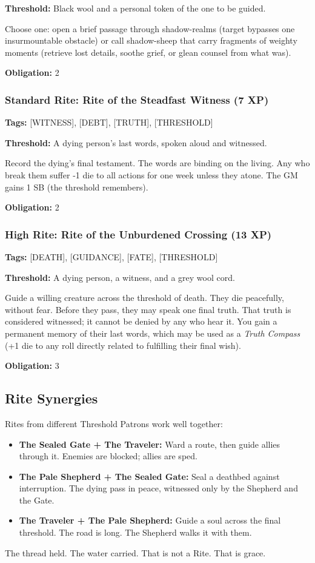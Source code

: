 \textbf{Threshold:} Black wool and a personal token of the one to be guided.

Choose one: open a brief passage through shadow-realms (target bypasses one insurmountable obstacle) or call shadow-sheep that carry fragments of weighty moments (retrieve lost details, soothe grief, or glean counsel from what was).

\textbf{Obligation:} 2

\subsubsection{Standard Rite: Rite of the Steadfast Witness (7 XP)}

\textbf{Tags:} [WITNESS], [DEBT], [TRUTH], [THRESHOLD]

\textbf{Threshold:} A dying person's last words, spoken aloud and witnessed.

Record the dying's final testament. The words are binding on the living. Any who break them suffer -1 die to all actions for one week unless they atone. The GM gains 1 SB (the threshold remembers).

\textbf{Obligation:} 2

\subsubsection{High Rite: Rite of the Unburdened Crossing (13 XP)}

\textbf{Tags:} [DEATH], [GUIDANCE], [FATE], [THRESHOLD]

\textbf{Threshold:} A dying person, a witness, and a grey wool cord.

Guide a willing creature across the threshold of death. They die peacefully, without fear. Before they pass, they may speak one final truth. That truth is considered witnessed; it cannot be denied by any who hear it. You gain a permanent memory of their last words, which may be used as a \textit{Truth Compass} (+1 die to any roll directly related to fulfilling their final wish).

\textbf{Obligation:} 3

\subsection{Rite Synergies}

Rites from different Threshold Patrons work well together:

\begin{itemize}
\item \textbf{The Sealed Gate + The Traveler:} Ward a route, then guide allies through it. Enemies are blocked; allies are sped.
\item \textbf{The Pale Shepherd + The Sealed Gate:} Seal a deathbed against interruption. The dying pass in peace, witnessed only by the Shepherd and the Gate.
\item \textbf{The Traveler + The Pale Shepherd:} Guide a soul across the final threshold. The road is long. The Shepherd walks it with them.
\end{itemize}

The thread held. The water carried. That is not a Rite. That is grace.
